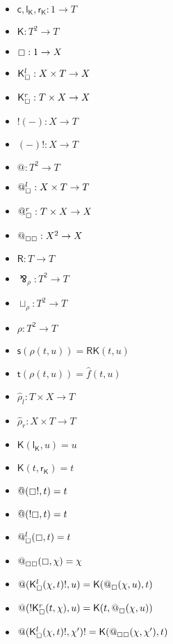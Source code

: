 \documentclass{llncs}
\renewcommand{\:}{\colon}
\begin{document}
\begin{itemize}
  \item $\mathsf{c}, \mathsf{l}_{\mathsf{K}}, \mathsf{r}_{\mathsf{K}} : 1 \rightarrow T$
  \item $\mathsf{K} : T^{2} \rightarrow T$
  \item $\boxempty : 1 \rightarrow X$
  \item $\mathsf{K}_{\boxempty}^{l} : X \times T \rightarrow X$
  \item $\mathsf{K}_{\boxempty}^{r} : T \times X \rightarrow X$
  \item $!(-) : X  \rightarrow T$
  \item $(-)! : X  \rightarrow T$
  \item $@ : T^{2} \rightarrow T$
  \item $@_{\boxempty}^{l} : X \times T \rightarrow T$
  \item $@_{\boxempty}^{r} : T \times X \rightarrow X$
  \item $@_{\boxempty\boxempty} : X^{2} \rightarrow X$
  \item $\mathsf{R} : T \rightarrow T$
  \item $\bindnasrepma_{\rho} : T^{2} \rightarrow T$
  \item $\sqcup_{\rho} : T^{2} \rightarrow T$
  \item $\rho : T^{2} \rightarrow T$             %
  \item $\mathsf{s}(\rho(t,u)) = \mathsf{R}\mathsf{K}(t, u)$ 
  \item $\mathsf{t}(\rho(t,u)) = \hat{f}(t,u)$          %
  \item $\hat{\rho}_{l} : T \times X \rightarrow T$             %
  \item $\hat{\rho}_{r} : X \times T \rightarrow T$             %
  \item $\mathsf{K}(\mathsf{l}_{\mathsf{K}}, u) = u$
  \item $\mathsf{K}(t, \mathsf{r}_{\mathsf{K}}) = t$
  \item $@(\boxempty !,t) = t$
  \item $@(!\boxempty,t) = t$
  \item $@_{\boxempty}^{l}(\boxempty ,t) = t$
  \item $@_{\boxempty\boxempty}(\boxempty,\chi) = \chi$
  \item $@(\mathsf{K}_{\boxempty}^{l} (\chi, t)!, u) = \mathsf{K}(@_{\boxempty}(\chi, u), t)$
  \item $@(!\mathsf{K}_{\boxempty}^{r} (t, \chi), u) = \mathsf{K}(t, @_{\boxempty}(\chi, u))$
  \item $@(\mathsf{K}_{\boxempty}^{l} (\chi, t)!, \chi')! = \mathsf{K}(@_{\boxempty\boxempty}(\chi, \chi'), t)$
\end{itemize}
\end{document}
